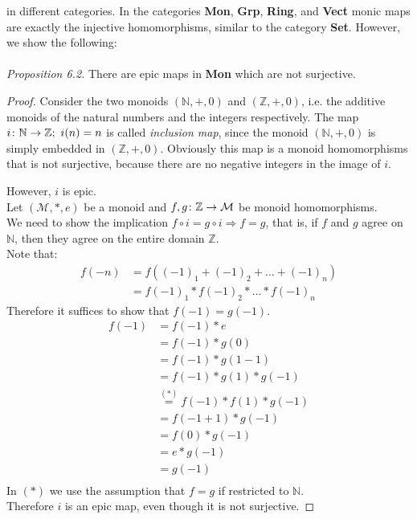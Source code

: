 in different categories.
In the categories \textbf{Mon}, \textbf{Grp}, \textbf{Ring}, and \textbf{Vect}
monic maps are exactly the injective homomorphisms,
similar to the category \textbf{Set}.
However, we show the following: \\
\\\textit{Proposition 6.2.} There are epic maps in \textbf{Mon} which are not surjective.
\begin{proof}
  Consider the two monoids $(\mathbb{N}, +, 0)$ and $(\mathbb{Z}, +, 0)$, i.e. the
  additive monoids of the natural numbers and the integers respectively.
  The map $i \from \mathbb{N} \to \mathbb{Z}; \ i(n) = n$ is called \emph{inclusion map},
  since the monoid $(\mathbb{N}, +, 0)$ is simply embedded in $(\mathbb{Z}, +, 0)$.
  Obviously this map is a monoid homomorphisms that is not surjective,
  because there are no negative integers in the image of $i$.

  However, $i$ is epic.\\
  Let $(\mathcal{M}, *, e)$ be a monoid and $f, g \from \mathbb{Z} \to \mathcal{M}$ be
  monoid homomorphisms.\\

  We need to show the implication $f \circ i = g \circ i \Rightarrow f = g$, that is,
  if $f$ and $g$ agree on $\mathbb{N}$, then they agree on the entire domain $\mathbb{Z}$.\\
  Note that:
  \begin{align*}
    f(-n) &= f ((-1)_1 + (-1)_2 + \dots + (-1)_n)\\
          &= f(-1)_1 * f(-1)_2 * \dots * f(-1)_n
  \end{align*}
  Therefore it suffices to show that $f(-1) = g(-1)$.
  \begin{align*}
    f(-1) &= f(-1) * e \\
          &= f(-1) * g(0) \\
          &= f(-1) * g(1 - 1) \\
          &= f(-1) * g(1) * g(-1) \\
          &\overset{(*)}{=} f(-1) * f(1) * g(-1) \\
          &= f(-1 + 1) * g(-1) \\
          &= f(0) * g(-1) \\
          &= e * g(-1) \\
          &= g(-1) \\ 
  \end{align*}
  In $(*)$ we use the assumption that $f=g$ if restricted to $\mathbb{N}$.\\
  Therefore $i$ is an epic map, even though it is not surjective.
\end{proof}


